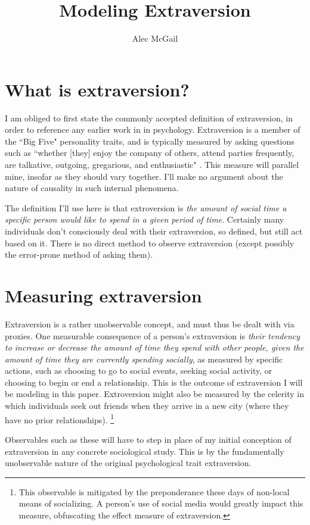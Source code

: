 \documentclass[]{article}
\title{Modeling Extraversion}
\author{Alec McGail}
\begin{document}
	\maketitle
	
	\section{What is extraversion?}
	I am obliged to first state the commonly accepted definition of extraversion, in order to reference any earlier work in in psychology. Extraversion is a member of the ``Big Five" personality traits, and is typically measured by asking questions such as ``whether [they] enjoy the company of others, attend parties	frequently, are talkative, outgoing, gregarious, and enthusiastic" \cite{Gosling2003}. This measure will parallel mine, insofar as they should vary together. I'll make no argument about the nature of causality in such internal phenomena.
	
	The definition I'll use here is that extroversion is \textit{the amount of social time a specific person would like to spend in a given period of time}. Certainly many individuals don't consciously deal with their extraversion, so defined, but still act based on it. There is no direct method to observe extraversion (except possibly the error-prone method of asking them).
	
	\section{Measuring extraversion}
	Extraversion is a rather unobservable concept, and must thus be dealt with via proxies.
	One measurable consequence of a person's extraversion is \textit{their tendency to increase or decrease the amount of time they spend with other people, given the amount of time they are currently spending socially}, as measured by specific actions, such as choosing to go to social events, seeking social activity, or choosing to begin or end a relationship. This is the outcome of extraversion I will be modeling in this paper. Extroversion might also be measured by the celerity in which individuals seek out friends when they arrive in a new city (where they have no prior relationships).
	\footnote{This observable is mitigated by the preponderance these days of non-local means of socializing. A person's use of social media would greatly impact this measure, obfuscating the effect measure of extraversion.}
	
	Observables such as these will have to step in place of my initial conception of extraversion in any concrete sociological study.
	This is by the fundamentally unobservable nature of the original psychological trait extraversion.
\end{document}
